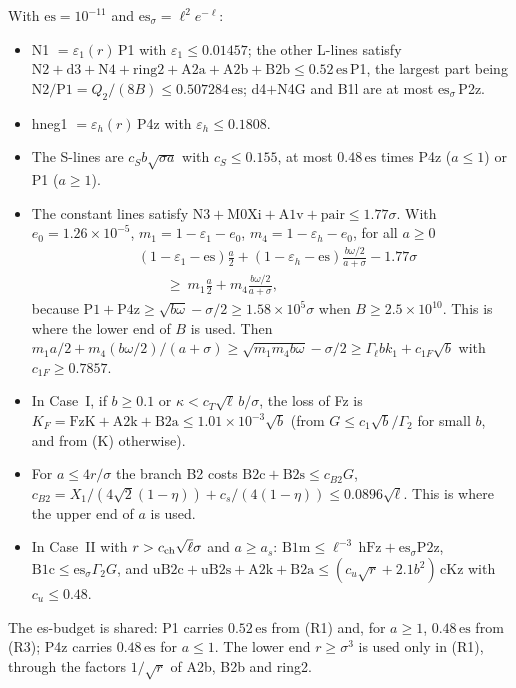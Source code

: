 With $\mathrm{es}=10^{-11}$ and $\mathrm{es}_\sigma=\ell^2e^{-\ell}$:
\begin{itemize}
\item[(R1)] N1 $=\varepsilon_1(r)\,$P1 with $\varepsilon_1\le0.01457$; the other L-lines satisfy $\mathrm{N2}+\mathrm{d3}+\mathrm{N4}+\mathrm{ring2}+\mathrm{A2a}+\mathrm{A2b}+\mathrm{B2b}\le0.52\,\mathrm{es}\,$P1, the largest part being $\mathrm{N2}/\mathrm{P1}=Q_2/(8B)\le0.507284\,\mathrm{es}$; d4$+$N4G and B1l are at most $\mathrm{es}_\sigma\,$P2z.
\item[(R2)] hneg1 $=\varepsilon_h(r)\,$P4z with $\varepsilon_h\le0.1808$.
\item[(R3)] The S-lines are $c_Sb\sqrt{\sigma a}$ with $c_S\le0.155$, at most $0.48\,\mathrm{es}$ times P4z ($a\le1$) or P1 ($a\ge1$).
\item[(R4)] The constant lines satisfy $\mathrm{N3}+\mathrm{M0Xi}+\mathrm{A1v}+\mathrm{pair}\le1.77\sigma$. With $e_0=1.26\times10^{-5}$, $m_1=1-\varepsilon_1-e_0$, $m_4=1-\varepsilon_h-e_0$, for all $a\ge0$
\begin{equation}
\begin{split}
&(1-\varepsilon_1-\mathrm{es})\frac a2+(1-\varepsilon_h-\mathrm{es})\frac{b\omega/2}{a+\sigma}-1.77\sigma\\&\qquad\ge\ m_1\frac a2+m_4\frac{b\omega/2}{a+\sigma},
\end{split}
\end{equation}
because $\mathrm{P1}+\mathrm{P4z}\ge\sqrt{b\omega}-\sigma/2\ge1.58\times10^5\sigma$ when $B\ge2.5\times10^{10}$. This is where the lower end of $B$ is used.
Then $m_1a/2+m_4(b\omega/2)/(a+\sigma)\ge\sqrt{m_1m_4b\omega}-\sigma/2\ge\Gamma_\ell bk_1+c_{1F}\sqrt b$ with $c_{1F}\ge0.7857$.
\item[(R5)] In Case~I, if $b\ge0.1$ or $\kappa<c_T\sqrt\ell\,b/\sigma$, the loss of Fz is $K_F=\mathrm{FzK}+\mathrm{A2k}+\mathrm{B2a}\le1.01\times10^{-3}\sqrt b$ (from $G\le c_1\sqrt b/\Gamma_2$ for small $b$, and from (K) otherwise).
\item[(R6)] For $a\le4r/\sigma$ the branch B2 costs $\mathrm{B2c}+\mathrm{B2s}\le c_{B2}G$, $c_{B2}=X_1/(4\sqrt2(1-\eta))+c_s/(4(1-\eta))\le0.0896\sqrt\ell$. This is where the upper end of $a$ is used.
\item[(R7)] In Case~II with $r>c_{\rm ch}\sqrt\ell\sigma$ and $a\ge a_s$: $\mathrm{B1m}\le\ell^{-3}\,\mathrm{hFz}+\mathrm{es}_\sigma\mathrm{P2z}$, $\mathrm{B1c}\le\mathrm{es}_\sigma\Gamma_2G$, and $\mathrm{uB2c}+\mathrm{uB2s}+\mathrm{A2k}+\mathrm{B2a}\le(c_u\sqrt r+2.1b^2)\,\mathrm{cKz}$ with $c_u\le0.48$.
\end{itemize}
The es-budget is shared: P1 carries $0.52\,\mathrm{es}$ from (R1) and, for $a\ge1$, $0.48\,\mathrm{es}$ from (R3); P4z carries $0.48\,\mathrm{es}$ for $a\le1$.
The lower end $r\ge\sigma^3$ is used only in (R1), through the factors $1/\sqrt r$ of A2b, B2b and ring2.

